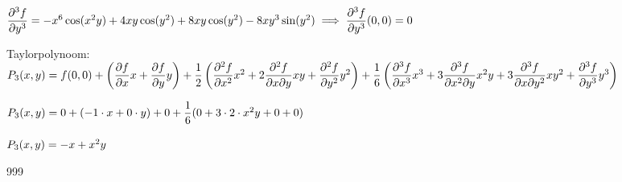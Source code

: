 \documentclass[a4paper]{article}
\begin{document}
$\dfrac{\partial^3 f}{\partial y^3} = -x^6 \cos(x^2y) + 4xy \cos(y^2) + 8xy \cos(y^2) - 8xy^3 \sin(y^2) \implies \dfrac{\partial^3 f}{\partial y^3}(0,0) = 0 \\$

Taylorpolynoom: \\

$P_3(x,y) = f(0,0) + \left(\dfrac{\partial f}{\partial x}x + \dfrac{\partial f}{\partial y}y\right) + \dfrac{1}{2}\left(\dfrac{\partial^2 f}{\partial x^2}x^2 + 2\dfrac{\partial^2 f}{\partial x \partial y}xy + \dfrac{\partial^2 f}{\partial y^2}y^2\right) + \dfrac{1}{6}\left(\dfrac{\partial^3 f}{\partial x^3}x^3 + 3\dfrac{\partial^3 f}{\partial x^2 \partial y}x^2y + 3\dfrac{\partial^3 f}{\partial x \partial y^2}xy^2 + \dfrac{\partial^3 f}{\partial y^3}y^3\right) \\$

$P_3(x,y) = 0 + (-1 \cdot x + 0 \cdot y) + 0 + \dfrac{1}{6}(0 + 3 \cdot 2 \cdot x^2y + 0 + 0) \\$

$P_3(x,y) = -x + x^2y \\$

\begin{thebibliography}{999}
\end{thebibliography}
\end{document}
